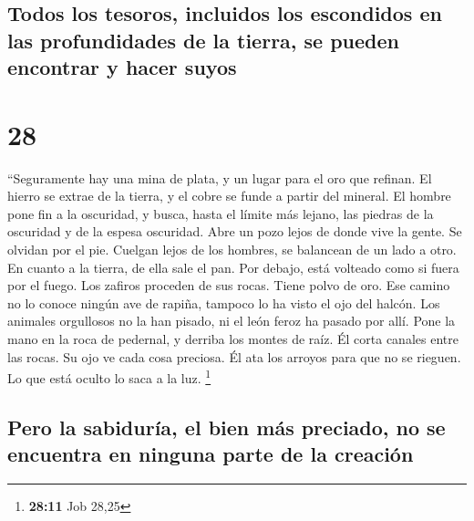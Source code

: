 \hypertarget{todos-los-tesoros-incluidos-los-escondidos-en-las-profundidades-de-la-tierra-se-pueden-encontrar-y-hacer-suyos}{%
\subsection{Todos los tesoros, incluidos los escondidos en las
profundidades de la tierra, se pueden encontrar y hacer
suyos}\label{todos-los-tesoros-incluidos-los-escondidos-en-las-profundidades-de-la-tierra-se-pueden-encontrar-y-hacer-suyos}}

\hypertarget{section-27}{%
\section{28}\label{section-27}}

 ``Seguramente hay una mina de plata, y un lugar para el
oro que refinan.  El hierro se extrae de la tierra, y el
cobre se funde a partir del mineral.  El hombre pone fin a
la oscuridad, y busca, hasta el límite más lejano, las piedras de la
oscuridad y de la espesa oscuridad.  Abre un pozo lejos de
donde vive la gente. Se olvidan por el pie. Cuelgan lejos de los
hombres, se balancean de un lado a otro.  En cuanto a la
tierra, de ella sale el pan. Por debajo, está volteado como si fuera por
el fuego.  Los zafiros proceden de sus rocas. Tiene polvo
de oro.  Ese camino no lo conoce ningún ave de rapiña,
tampoco lo ha visto el ojo del halcón.  Los animales
orgullosos no la han pisado, ni el león feroz ha pasado por allí.
 Pone la mano en la roca de pedernal, y derriba los montes
de raíz.  Él corta canales entre las rocas. Su ojo ve
cada cosa preciosa.  Él ata los arroyos para que no se
rieguen. Lo que está oculto lo saca a la luz. \footnote{\textbf{28:11}
  Job 28,25}

\hypertarget{pero-la-sabiduruxeda-el-bien-muxe1s-preciado-no-se-encuentra-en-ninguna-parte-de-la-creaciuxf3n}{%
\subsection{Pero la sabiduría, el bien más preciado, no se encuentra en
ninguna parte de la
creación}\label{pero-la-sabiduruxeda-el-bien-muxe1s-preciado-no-se-encuentra-en-ninguna-parte-de-la-creaciuxf3n}}

